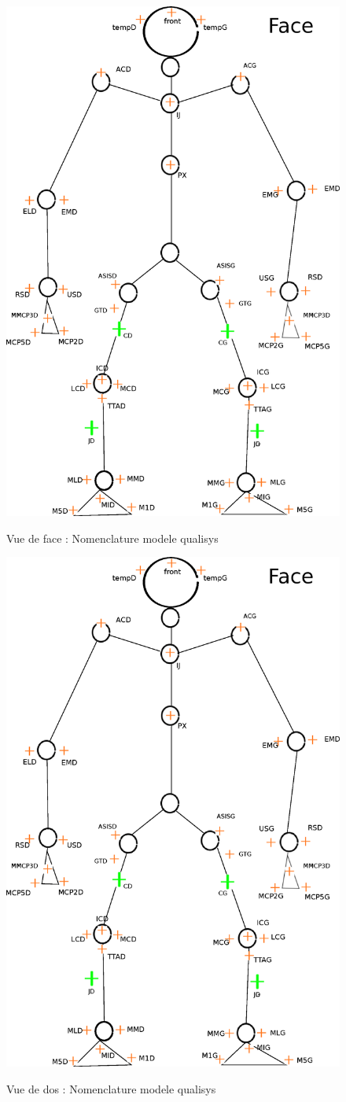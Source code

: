 \documentclass[a4paper, 10pt ]{article}
\begin{document}
\begin{figure}
\includegraphics[width=0.7\columnwidth]{images/modeleHommeQualisys.eps}
\label{fig:marqueursFace}
\caption{Vue de face : Nomenclature modele qualisys}
\end{figure}

\begin{figure}
\includegraphics[width=0.7\columnwidth]{images/modeleHommeQualisys.eps}
\label{fig:marqueursDos}
\caption{Vue de dos : Nomenclature modele qualisys}
\end{figure}
\end{document}
